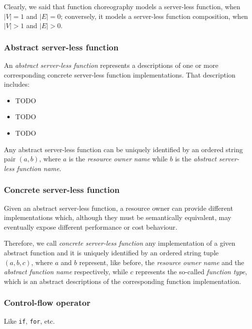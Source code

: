 Clearly, we said that function choreography models a server-less function, when $|V| = 1$ and $|E| = 0$; conversely, it models a server-less function composition, when $|V| > 1$ and $|E| > 0$.

\subsubsection{Abstract server-less function}

An \textit{abstract server-less function} represents a descriptions of one or more corresponding concrete server-less function implementations. That description includes:

\begin{itemize}
	
	\item TODO
	\item TODO
	\item TODO
	
\end{itemize}

Any abstract server-less function can be uniquely identified by an ordered string pair $(a, b)$, where $a$ is the \textit{resource owner name} while $b$ is the \textit{abstract server-less function name}.

\subsubsection{Concrete server-less function}

Given an abstract server-less function, a resource owner can provide different implementations which, although they must be semantically equivalent, may eventually expose different performance or cost behaviour.

Therefore, we call \textit{concrete server-less function} any implementation of a given abstract function and it is uniquely identified by an ordered string tuple $(a, b, c)$, where $a$ and $b$ represent, like before, the \textit{resource owner name} and the \textit{abstract function name} respectively, while $c$ represents the so-called \textit{function type}, which is an abstract descriptions of the corresponding function implementation.

\subsubsection{Control-flow operator}

Like \texttt{if}, \texttt{for}, etc.


